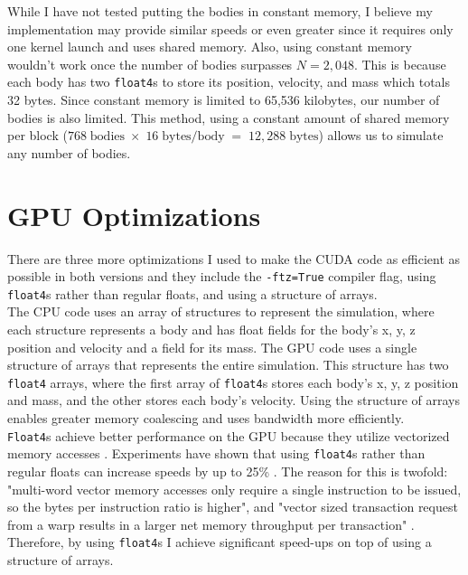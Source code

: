 \indent While I have not tested putting the bodies in constant memory, I believe my implementation may provide similar speeds or even greater since it requires only one kernel launch and uses shared memory. Also, using constant memory wouldn't work once the number of bodies surpasses $N = 2,048$. This is because each body has two \verb|float4|s to store its position, velocity, and mass which totals 32 bytes. Since constant memory is limited to 65,536 kilobytes, our number of bodies is also limited. This method, using a constant amount of shared memory per block ($768\;\text{bodies}\;\times\;16\;\text{bytes/body}\;=\;12,288\;\text{bytes}$) allows us to simulate any number of bodies.

\section{GPU Optimizations}
\indent There are three more optimizations I used to make the CUDA code as efficient as possible in both versions and they include the \verb|-ftz=True| compiler flag, using \verb|float4|s rather than regular floats, and using a structure of arrays. \\
\indent The CPU code uses an array of structures to represent the simulation, where each structure represents a body and has float fields for the body's x, y, z position and velocity and a field for its mass. The GPU code uses a single structure of arrays that represents the entire simulation. This structure has two \verb|float4| arrays, where the first array of \verb|float4|s stores each body's x, y, z position and mass, and the other stores each body's velocity. Using the structure of arrays enables greater memory coalescing and uses bandwidth more efficiently.\\
\indent \verb|Float4|s achieve better performance on the GPU because they utilize vectorized memory accesses \cite{Luitjens_2013}. Experiments have shown that using \verb|float4|s rather than regular floats can increase speeds by up to 25\% \cite{Vitality_2014}. The reason for this is twofold: "multi-word vector memory accesses only require a single instruction to be issued, so the bytes per instruction ratio is higher", and "vector sized transaction request from a warp results in a larger net memory throughput per transaction" \cite{talonmies_2015}. Therefore, by using \verb|float4|s I achieve significant speed-ups on top of using a structure of arrays.\\
